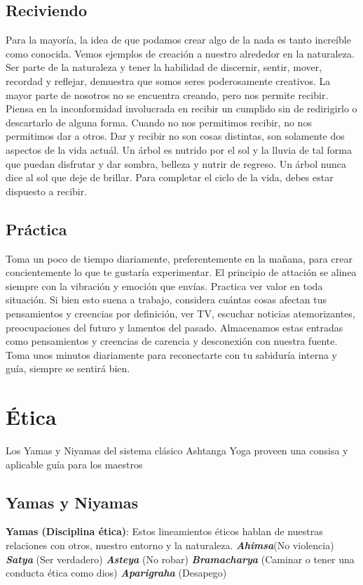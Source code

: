 \begin{itemize}
\subsection{Reciviendo}
Para la mayoría, la idea de que podamos crear algo de la nada es tanto increíble como conocida. Vemos ejemplos de creación a nuestro alrededor en la naturaleza. Ser parte de la naturaleza y tener la habilidad de discernir, sentir, mover, recordad y reflejar, demuestra que somos seres poderosamente creativos. La mayor parte de nosotros no se encuentra creando, pero nos permite recibir. Piensa en la inconformidad involucrada en recibir un cumplido sin de redirigirlo o descartarlo de alguna forma. Cuando no nos permitimos recibir, no nos permitimos dar a otros. Dar y recibir no son cosas distintas, son solamente dos aspectos de la vida actuál. Un árbol es nutrido por el sol y la lluvia de tal forma que puedan disfrutar y dar sombra, belleza y nutrir de regreso. Un árbol nunca dice al sol que deje de brillar. Para completar el ciclo de la vida, debes estar dispuesto a recibir.

\subsection{Práctica}
Toma un poco de tiempo diariamente, preferentemente en la mañana, para crear concientemente lo que te gustaría experimentar. El principio de attación se alinea siempre con la vibración y emoción que envías. Practica ver valor en toda situación. Si bien esto suena a trabajo, considera cuántas cosas afectan tus pensamientos y creencias por definición, ver TV, escuchar noticias atemorizantes, preocupaciones del futuro y lamentos del pasado. Almacenamos estas entradas como pensamientos y creencias de carencia y desconexión con nuestra fuente. Toma unos minutos diariamente para reconectarte con tu sabiduría interna y guía, siempre se sentirá bien.

\section{Ética}
Los Yamas y Niyamas del sistema clásico Ashtanga Yoga proveen una consisa y aplicable guía para los maestros

\subsection{Yamas y Niyamas}
\textbf{Yamas (Disciplina \'etica)}: Estos lineamientos \'eticos hablan de nuestras relaciones con otros, nuestro entorno y la naturaleza.
\textbf{\textit{Ahimsa}}(No violencia)
\textbf{\textit{Satya}} (Ser verdadero)
\textbf{\textit{Asteya}} (No robar)
\textbf{\textit{Bramacharya}} (Caminar o tener una conducta \'etica como dios)
\textbf{\textit{Aparigraha}} (Desapego)


\end{itemize}

